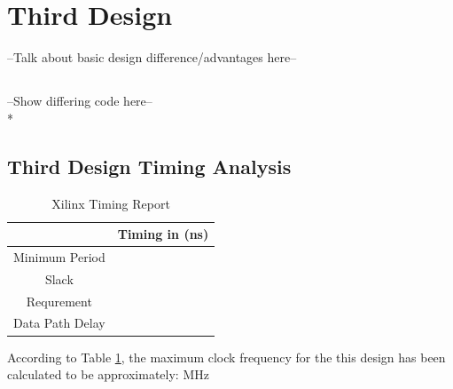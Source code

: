 \section*{Third Design}
--Talk about basic design difference/advantages here-- 

\subsection*{}
--Show differing code here-- \\*



\subsection*{Third Design Timing Analysis}

\begin{table}[bh]
\caption{Xilinx Timing Report}
\begin{tabular}{c|c}
\centering
           & Timing in (ns) \\
\hline
Minimum Period &     \\

     Slack &     \\

Requrement &        \\

Data Path Delay &     \\
\end{tabular}  
\label{tab:timing3}
\end{table}

According to Table \ref{tab:timing3}, the maximum clock frequency for the this design has been calculated to be approximately:  MHz


